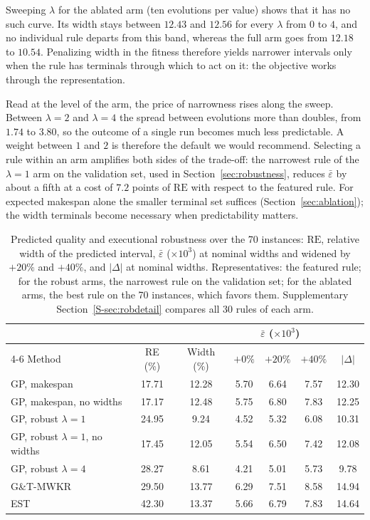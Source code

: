 \documentclass[preprint,number,sort&compress,12pt]{elsarticle}
\newcommand{\RE}{\mathrm{RE}}
\begin{document}
Sweeping $\lambda$ for the ablated arm (ten evolutions per value)
shows that it has no such curve. Its width stays between $12.43$ and
$12.56$ for every $\lambda$ from $0$ to $4$, and no individual rule
departs from this band, whereas the full arm goes from $12.18$ to
$10.54$. Penalizing width in the fitness therefore yields narrower
intervals only when the rule has terminals through which to act on it:
the objective works through the representation.

Read at the level of the arm, the price of narrowness rises along the
sweep. Between $\lambda = 2$ and $\lambda = 4$ the spread between
evolutions more than doubles, from $1.74$ to $3.80$, so the outcome of a
single run becomes much less predictable. A weight between $1$ and $2$
is therefore the default we would recommend. Selecting a rule within an
arm amplifies both sides of the trade-off: the narrowest rule of the
$\lambda = 1$ arm on the validation set, used in
Section~\ref{sec:robustness}, reduces $\bar\varepsilon$ by about a fifth
at a cost of $7.2$ points of $\RE$ with respect to the featured rule. For expected makespan alone the smaller
terminal set suffices (Section~\ref{sec:ablation}); the width terminals
become necessary when predictability matters.


\begin{table}[t]
\centering\small
\setlength{\tabcolsep}{4pt}
\caption{Predicted quality and executional robustness over the 70 instances:
$\RE$, relative width of the predicted interval, $\bar\varepsilon$
($\times10^3$) at nominal widths and widened by $+20\%$ and $+40\%$, and
$|\Delta|$ at nominal widths. Representatives: the featured rule; for
the robust arms, the narrowest rule on the validation set; for the
ablated arms, the best rule on the 70 instances, which favors them.
Supplementary Section~\ref{S-sec:robdetail} compares all 30 rules of
each arm.}
\label{tab:robustness}
\begin{tabular}{lcccccc}
\toprule
& & & \multicolumn{3}{c}{$\bar\varepsilon$ ($\times10^3$)} & \\
\cmidrule(lr){4-6}
Method & RE (\%) & Width (\%) & $+0\%$ & $+20\%$ & $+40\%$ &
$|\Delta|$ \\
\midrule
GP, makespan & 17.71 & 12.28 & 5.70 & 6.64 & 7.57 & 12.30 \\
GP, makespan, no widths & 17.17 & 12.48 & 5.75 & 6.80 & 7.83 &
12.25 \\
GP, robust $\lambda{=}1$ & 24.95 & 9.24 & 4.52 & 5.32 & 6.08 &
10.31 \\
GP, robust $\lambda{=}1$, no widths & 17.45 & 12.05 & 5.54 & 6.50 & 7.42 &
12.08 \\
GP, robust $\lambda{=}4$ & 28.27 & 8.61 & 4.21 & 5.01 & 5.73 &
9.78 \\
\midrule
G\&T-MWKR & 29.50 & 13.77 & 6.29 & 7.51 & 8.58 & 14.94 \\
EST & 42.30 & 13.37 & 5.66 & 6.79 & 7.83 & 14.64 \\
\bottomrule
\end{tabular}
\end{table}
\end{document}
